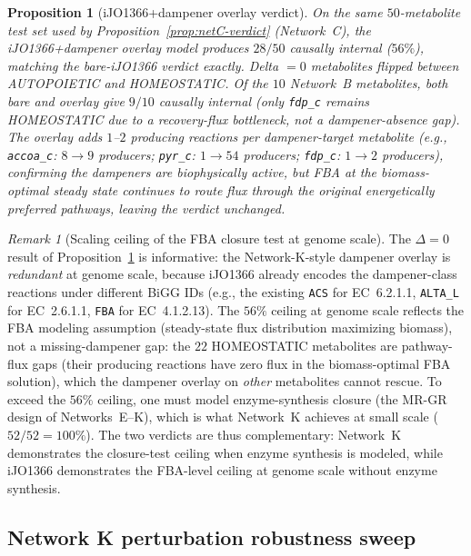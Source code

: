 \documentclass[11pt,a4paper]{article}
\theoremstyle{plain}
\newtheorem{proposition}[theorem]{Proposition}
\theoremstyle{definition}
\theoremstyle{remark}
\newtheorem{remark}[theorem]{Remark}
\begin{document}
\begin{proposition}[iJO1366+dampener overlay verdict]
\label{prop:ijO1366-overlay}
On the same $50$-metabolite test set used by
Proposition~\ref{prop:netC-verdict} (Network~C), the iJO1366+dampener
overlay model produces $28/50$ causally internal ($56\%$), matching
the bare-iJO1366 verdict exactly. Delta $= 0$ metabolites flipped
between AUTOPOIETIC and HOMEOSTATIC. Of the $10$ Network~B
metabolites, both bare and overlay give $9/10$ causally internal
(only \texttt{fdp\_c} remains HOMEOSTATIC due to a recovery-flux
bottleneck, not a dampener-absence gap). The overlay adds $1$--$2$
producing reactions per dampener-target metabolite (e.g.,
\texttt{accoa\_c}: $8 \to 9$ producers; \texttt{pyr\_c}: $1 \to 54$
producers; \texttt{fdp\_c}: $1 \to 2$ producers), confirming the
dampeners are biophysically active, but FBA at the biomass-optimal
steady state continues to route flux through the original energetically
preferred pathways, leaving the verdict unchanged.
\end{proposition}

\begin{remark}[Scaling ceiling of the FBA closure test at genome scale]
\label{rem:ijO1366-overlay-ceiling}
The $\Delta = 0$ result of Proposition~\ref{prop:ijO1366-overlay} is
informative: the Network-K-style dampener overlay is \emph{redundant}
at genome scale, because iJO1366 already encodes the dampener-class
reactions under different BiGG IDs (e.g., the existing
\texttt{ACS} for EC~6.2.1.1, \texttt{ALTA\_L} for EC~2.6.1.1,
\texttt{FBA} for EC~4.1.2.13). The $56\%$ ceiling at genome scale
reflects the FBA modeling assumption (steady-state flux distribution
maximizing biomass), not a missing-dampener gap: the $22$ HOMEOSTATIC
metabolites are pathway-flux gaps (their producing reactions have zero
flux in the biomass-optimal FBA solution), which the dampener overlay
on \emph{other} metabolites cannot rescue. To exceed the $56\%$
ceiling, one must model enzyme-synthesis closure (the MR-GR design
of Networks~E--K), which is what Network~K achieves at small scale
($52/52 = 100\%$). The two verdicts are thus complementary:
Network~K demonstrates the closure-test ceiling when enzyme synthesis
is modeled, while iJO1366 demonstrates the FBA-level ceiling at
genome scale without enzyme synthesis.
\end{remark}

\subsection{Network K perturbation robustness sweep}
\label{sec:autopoiesis-network-K-robust}
\end{document}
